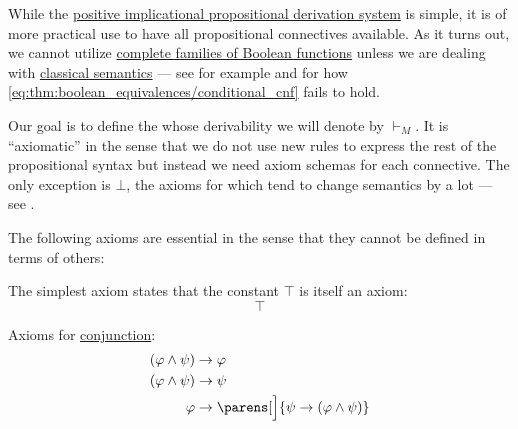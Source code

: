 \begin{definition}\label{def:minimal_propositional_axiomatic_derivation_system}
  While the \hyperref[def:positive_implicational_propositional_derivation_system]{positive implicational propositional derivation system} is simple, it is of more practical use to have all propositional connectives available. As it turns out, we cannot utilize \hyperref[ex:posts_completeness_theorem]{complete families of Boolean functions} unless we are dealing with \hyperref[def:propositional_semantics]{classical semantics} --- see for example  and  for how \cref{eq:thm:boolean_equivalences/conditional_cnf} fails to hold.

  Our goal is to define the  whose derivability we will denote by \( \vdash_M \). It is \enquote{axiomatic} in the sense that we do not use new rules to express the rest of the propositional syntax but instead we need axiom schemas for each connective. The only exception is \hyperref[def:propositional_language/constants/top]{\( \bot \)}, the axioms for which tend to change semantics by a lot --- see .

  The following axioms are essential in the sense that they cannot be defined in terms of others:
  \begin{thmenum}[series=def:minimal_propositional_axiomatic_derivation_system]
     The simplest axiom states that the constant \hyperref[def:propositional_language/constants/top]{\( \top \)} is itself an axiom:
    \begin{equation}\label{eq:def:minimal_propositional_axiomatic_derivation_system/top_intro}
      \top
    \end{equation}

     Axioms for \hyperref[def:propositional_language/connectives/conjunction]{conjunction}:
    \begin{align}
      (\varphi \wedge \psi) &\rightarrow \varphi \label{eq:def:minimal_propositional_axiomatic_derivation_system/and_elim_left} \\
      (\varphi \wedge \psi) &\rightarrow \psi \label{eq:def:minimal_propositional_axiomatic_derivation_system/and_elim_right} \\
      \varphi               &\rightarrow \parens[\Big]{ \psi \rightarrow (\varphi \wedge \psi) } \label{eq:def:minimal_propositional_axiomatic_derivation_system/and_intro}
    \end{align}


\end{thmenum}
\end{definition}
